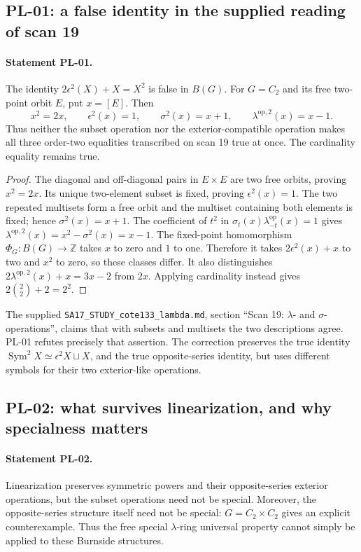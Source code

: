 \documentclass[11pt,a4paper]{article}
\begin{document}
\subsection{PL-01: a false identity in the supplied reading of scan 19}
\paragraph{Statement PL-01.}
The identity $2\epsilon^2(X)+X=X^2$ is false in $B(G)$.
For $G=C_2$ and its free two-point orbit $E$, put $x=[E]$. Then
\[
 x^2=2x,\qquad \epsilon^2(x)=1,\qquad
 \sigma^2(x)=x+1,\qquad \lambda^{\mathrm{op},2}(x)=x-1.
\]
Thus neither the subset operation nor the exterior-compatible operation makes
all three order-two equalities transcribed on scan 19 true at once. The
cardinality equality remains true.

\begin{proof}
The diagonal and off-diagonal pairs in $E\times E$ are two free orbits, proving
$x^2=2x$. Its unique two-element subset is fixed, proving $\epsilon^2(x)=1$.
The two repeated multisets form a free orbit and the multiset containing both
elements is fixed; hence $\sigma^2(x)=x+1$. The coefficient of $t^2$ in
$\sigma_t(x)\lambda^{\mathrm{op}}_{-t}(x)=1$ gives
$\lambda^{\mathrm{op},2}(x)=x^2-\sigma^2(x)=x-1$.
The fixed-point homomorphism $\Phi_G:B(G)\to\mathbb Z$ takes $x$ to zero
and $1$ to one. Therefore it takes $2\epsilon^2(x)+x$ to two and $x^2$ to
zero, so these classes differ. It also distinguishes
$2\lambda^{\mathrm{op},2}(x)+x=3x-2$ from $2x$.
Applying cardinality instead gives $2\binom{2}{2}+2=2^2$.
\end{proof}

The supplied \texttt{SA17\_STUDY\_cote133\_lambda.md}, section
``Scan 19: $\lambda$- and $\sigma$-operations'', claims that with subsets and
multisets the two descriptions agree. PL-01 refutes precisely that assertion.
The correction preserves the true identity
$\operatorname{Sym}^2X\simeq\epsilon^2X\sqcup X$, and the true opposite-series
identity, but uses different symbols for their two exterior-like operations.

\subsection{PL-02: what survives linearization, and why specialness matters}
\paragraph{Statement PL-02.}
Linearization preserves symmetric powers and their opposite-series exterior
operations, but the subset operations need not be special. Moreover, the
opposite-series structure itself need not be special: $G=C_2\times C_2$ gives
an explicit counterexample. Thus the free special $\lambda$-ring universal
property cannot simply be applied to these Burnside structures.
\end{document}
